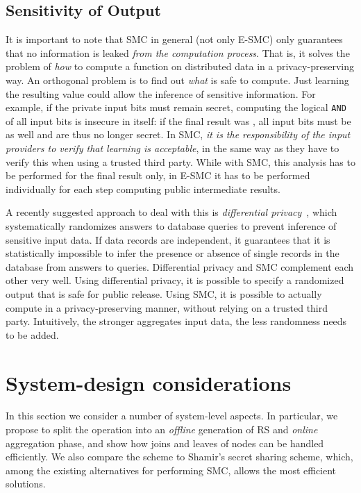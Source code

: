 \documentclass{sig-alternate}
\begin{document}
\subsection{Sensitivity of Output}
It is important to note that SMC in general (not only E-SMC) only guarantees that no information is leaked \emph{from the computation process}. 
That is, it solves the problem of \emph{how} to compute a function  on distributed data in a privacy-preserving way. 
An orthogonal problem is to find out \emph{what} is safe to compute.
Just learning the resulting value  could allow the inference of sensitive information.
For example, if the private input bits must remain secret, computing the logical \texttt{AND} of all
input bits is insecure in itself: if the final result was , all input bits must be  as well and are thus no longer secret.
In SMC, \emph{it is the responsibility of the input providers to verify that learning  is acceptable}, 
in the same way as they have to verify this when using a trusted third party.
While with SMC, this analysis has to be performed for the final result only, in E-SMC it has to be
performed individually for each step computing public intermediate results.

A recently suggested approach to deal with this is \emph{differential privacy}~\cite{dwork2008differential,differentialPrivacy2010}, 
which systematically randomizes answers to database queries to prevent inference of sensitive input data.
If data records are independent, it guarantees that it is statistically impossible to infer the presence or absence of 
single records in the database from answers to queries.
Differential privacy and SMC complement each other very well. Using differential privacy, it is possible to 
specify a randomized output  that is safe for public release. Using SMC,
it is possible to actually compute  in a privacy-preserving manner, without relying on a trusted third party.
Intuitively, the stronger  aggregates input data, the less randomness needs to be added.


\section{System-design considerations}\label{sec:design}


In this section we consider a number of system-level aspects. In particular, 
we propose to split the \ata operation into an \emph{offline} generation of RS and \emph{online} aggregation phase, and show how joins and leaves of nodes can be  handled efficiently.
We also compare the \ata scheme to Shamir's secret sharing scheme, which, among the existing alternatives for performing SMC, allows the most efficient solutions.
\end{document}
